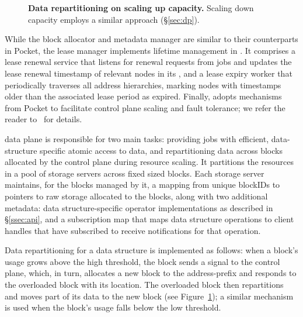 \begin{figure}
  \caption[Data repartitioning on scaling up capacity]{\small\textbf{Data repartitioning on scaling up capacity.} Scaling down capacity employs a similar approach (\S\ref{sec:dp}).}\label{fig:autoscaling}
\end{figure}
%
While the block allocator and metadata manager are similar to their counterparts in Pocket, the lease manager implements lifetime management in \jiffy. It comprises a lease renewal service that listens for renewal requests from jobs and updates the lease renewal timestamp of relevant nodes in its \lh, and a lease expiry worker that periodically traverses all address hierarchies, marking nodes with timestamps older than the associated lease period as expired. Finally, \jiffy adopts mechanisms from Pocket to facilitate control plane scaling and fault tolerance; we refer the reader to~\cite{pocket} for details.

 \jiffy data plane is responsible for two main tasks: providing jobs with efficient, data-structure specific atomic access to data, and repartitioning data across blocks allocated by the control plane during resource scaling. It partitions the resources in a pool of storage servers across fixed sized blocks. Each storage server maintains, for the blocks managed by it, a mapping from unique blockIDs to pointers to raw storage allocated to the blocks, along with two additional metadata: data structure-specific operator implementations as described in \S\ref{ssec:api}, and a subscription map that maps data structure operations to client handles that have subscribed to receive notifications for that operation. 

Data repartitioning for a \jiffy data structure is implemented as follows: when a block's usage grows above the high threshold, the block sends a signal to the control plane, which, in turn, allocates a new block to the address-prefix and responds to the overloaded block with its location. The overloaded block then repartitions and moves part of its data to the new block (see Figure~\ref{fig:autoscaling}); a similar mechanism is used when the block's usage falls below the low threshold. 

